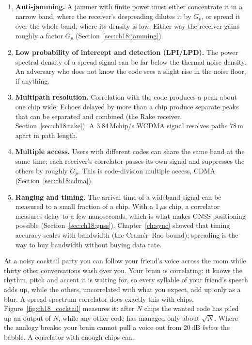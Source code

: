 \begin{enumerate}
\item \textbf{Anti-jamming.} A jammer with finite power must either concentrate it in a
narrow band, where the receiver's despreading dilutes it by $G_p$, or spread it over the
whole band, where its density is low. Either way the receiver gains roughly a factor $G_p$
(Section~\ref{sec:ch18:jamming}).
\item \textbf{Low probability of intercept and detection (LPI/LPD).} The power spectral
density of a spread signal can be far below the thermal noise density. An adversary who
does not know the code sees a slight rise in the noise floor, if anything.
\item \textbf{Multipath resolution.} Correlation with the code produces a peak about one chip
wide. Echoes delayed by more than a chip produce separate peaks that can be separated and
combined (the Rake receiver, Section~\ref{sec:ch18:rake}). A 3.84\,Mchip/s WCDMA signal
resolves paths 78\,m apart in path length.
\item \textbf{Multiple access.} Users with different codes can share the same band at the same
time; each receiver's correlator passes its own signal and suppresses the others by
roughly $G_p$. This is code-division multiple access, CDMA (Section~\ref{sec:ch18:cdma}).
\item \textbf{Ranging and timing.} The arrival time of a wideband signal can be measured to a
small fraction of a chip. With a 1\,$\mu$s chip, a correlator measures delay to a few
nanoseconds, which is what makes GNSS positioning possible (Section~\ref{sec:ch18:gnss}).
Chapter~\ref{ch:sync} showed that timing accuracy scales with bandwidth (the Cram\'er--Rao
bound); spreading is the way to buy bandwidth without buying data rate.
\end{enumerate}

\begin{analogy}
At a noisy cocktail party you can follow your friend's voice across the room while thirty other
conversations wash over you. Your brain is correlating: it knows the rhythm, pitch and accent it
is waiting for, so every syllable of your friend's speech adds up, while the others, uncorrelated
with what you expect, add up only as a blur. A spread-spectrum correlator does exactly this with
chips. Figure~\ref{fig:ch18_cocktail} measures it: after $N$ chips the wanted code has piled up an
output of $N$, while any other code has managed only about $\sqrt N$. Where the analogy breaks:
your brain cannot pull a voice out from 20\,dB \emph{below} the babble. A correlator with
enough chips can.
\end{analogy}

